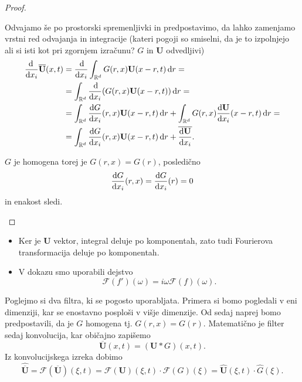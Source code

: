 \documentclass[mat2, tisk]{fmfdelo}
\newcommand{\R}{\mathbb R}
\newcommand{\bd}{\textbf}
\begin{document}
\begin{proof}
\begin{enumerate}
  Odvajamo še po prostorski spremenljivki in predpostavimo, da lahko zamenjamo vrstni red odvajanja in integracije 
  (kateri pogoji so smiselni, da je to izpolnjejo ali si isti kot pri zgornjem izračunu? $G$ in $\bd{U}$ odvedljivi) 
  \begin{align*}
  \frac{\!\!\dif}{\dif x_i} \overline{\bd{U}}(x, t) &= \frac{\dif}{\dif x_i} \int_{\R^d} G(r, x) \bd{U}(x-r, t) \dif r = \\
  &=  \int_{\R^d} \frac{\dif}{\dif x_i} (G(r, x) \bd{U}(x-r, t)) \dif r = \\
  &=  \int_{\R^d} \frac{\dif G}{\dif x_i}(r, x)  \bd{U}(x-r, t) \dif r + \int_{\R^d} G(r, x)  \frac{\dif \bd{U}}{\dif x_i}(x-r, t) \dif r = \\
  &= \int_{\R^d} \frac{\dif G}{\dif x_i}(r, x)  \bd{U}(x-r, t) \dif r + \overline{\frac{\dif \bd{U}}{\dif x_i}}.
  \end{align*}

  $G$ je homogena torej je $G(r, x) = G(r)$, posledično 
  $$\frac{\dif G}{\dif x_i}(r, x) = \frac{\dif G}{\dif x_i}(r) = 0$$
  in enakost sledi.
\end{enumerate}
\end{proof}

\begin{opomba}
  \hfill
\begin{itemize}
  \item Ker je $\bd{U}$ vektor, integral deluje po komponentah, zato tudi Fourierova transformacija deluje po komponentah. 
  \item V dokazu smo uporabili dejstvo 
  $$ \mathcal{F}(f')(\omega) =  i\omega \mathcal{F}(f)(\omega). $$
\end{itemize}
\end{opomba}

\noindent
Poglejmo si dva filtra, ki se pogosto uporabljata. Primera si bomo pogledali v eni dimenziji, 
kar se enostavno  posploši v višje dimenzije. Od sedaj naprej bomo predpostavili, da je 
$G$ homogena tj. $G(r, x) = G(r)$. Matematično je filter sedaj konvolucija, kar običajno 
zapišemo
\begin{equation}
\overline{\bd{U}}(x, t) = (\bd{U} * G)(x, t).
\end{equation}
Iz konvolucijskega izreka dobimo 
\begin{equation}
\hat{\overline{\bd{U}}} = \mathcal{F}(\overline{\bd{U}})(\xi, t) = \mathcal{F}(\bd{U})(\xi, t)\cdot \mathcal{F}(G)(\xi)= 
\hat{\bd{U}}(\xi, t)\cdot \hat{G}(\xi).
\end{equation}
\\[1mm] 
\end{document}
